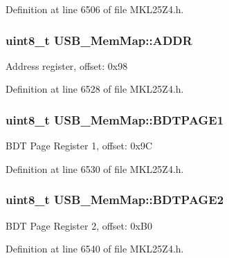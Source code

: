 Definition at line 6506 of file M\+K\+L25\+Z4.\+h.

\subsubsection[{\texorpdfstring{A\+D\+DR}{ADDR}}]{\setlength{\rightskip}{0pt plus 5cm}uint8\+\_\+t U\+S\+B\+\_\+\+Mem\+Map\+::\+A\+D\+DR}\hypertarget{struct_u_s_b___mem_map_a6b1fac9acdf7f6c7e0471af3886c6a8e}{}\label{struct_u_s_b___mem_map_a6b1fac9acdf7f6c7e0471af3886c6a8e}
Address register, offset\+: 0x98 

Definition at line 6528 of file M\+K\+L25\+Z4.\+h.

\subsubsection[{\texorpdfstring{B\+D\+T\+P\+A\+G\+E1}{BDTPAGE1}}]{\setlength{\rightskip}{0pt plus 5cm}uint8\+\_\+t U\+S\+B\+\_\+\+Mem\+Map\+::\+B\+D\+T\+P\+A\+G\+E1}\hypertarget{struct_u_s_b___mem_map_ac61eff507f744f947ebf311e4d0a3767}{}\label{struct_u_s_b___mem_map_ac61eff507f744f947ebf311e4d0a3767}
B\+DT Page Register 1, offset\+: 0x9C 

Definition at line 6530 of file M\+K\+L25\+Z4.\+h.

\subsubsection[{\texorpdfstring{B\+D\+T\+P\+A\+G\+E2}{BDTPAGE2}}]{\setlength{\rightskip}{0pt plus 5cm}uint8\+\_\+t U\+S\+B\+\_\+\+Mem\+Map\+::\+B\+D\+T\+P\+A\+G\+E2}\hypertarget{struct_u_s_b___mem_map_abb9113fced941f9af402d501dd6dc301}{}\label{struct_u_s_b___mem_map_abb9113fced941f9af402d501dd6dc301}
B\+DT Page Register 2, offset\+: 0x\+B0 

Definition at line 6540 of file M\+K\+L25\+Z4.\+h.

